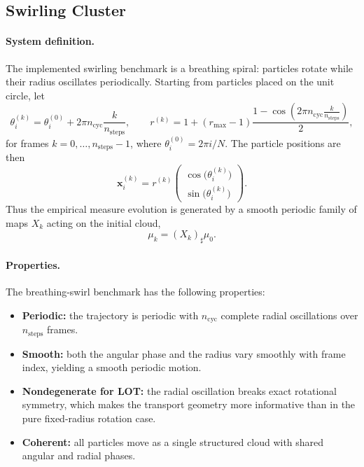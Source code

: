 \documentclass[11pt]{article}
\newcommand{\1}{\mathbf{1}}
\begin{document}
\subsection{Swirling Cluster}\label{sec:swirl}

\paragraph{System definition.}
The implemented swirling benchmark is a breathing spiral: particles rotate while their radius oscillates periodically. Starting from particles placed on the unit circle, let
\begin{equation}\label{eq:swirl-ode}
\theta_i^{(k)} = \theta_i^{(0)} + 2\pi n_{\mathrm{cyc}}\frac{k}{n_{\mathrm{steps}}}, 
\qquad
r^{(k)} = 1 + (r_{\max}-1)\frac{1-\cos\!\left(2\pi n_{\mathrm{cyc}} \frac{k}{n_{\mathrm{steps}}}\right)}{2},
\end{equation}
for frames \(k=0,\dots,n_{\mathrm{steps}}-1\), where \(\theta_i^{(0)}=2\pi i/N\). The particle positions are then
\[
\mathbf{x}_i^{(k)} = r^{(k)}
\begin{pmatrix}
\cos\!\bigl(\theta_i^{(k)}\bigr)\\[0.3ex]
\sin\!\bigl(\theta_i^{(k)}\bigr)
\end{pmatrix}.
\]
Thus the empirical measure evolution is generated by a smooth periodic family of maps \(X_k\) acting on the initial cloud,
\begin{equation}\label{eq:swirl-measure}
\mu_k = (X_k)_\sharp \mu_0.
\end{equation}

\paragraph{Properties.}
The breathing-swirl benchmark has the following properties:
\begin{itemize}
\item \textbf{Periodic:} the trajectory is periodic with \(n_{\mathrm{cyc}}\) complete radial oscillations over \(n_{\mathrm{steps}}\) frames.
\item \textbf{Smooth:} both the angular phase and the radius vary smoothly with frame index, yielding a smooth periodic motion.
\item \textbf{Nondegenerate for LOT:} the radial oscillation breaks exact rotational symmetry, which makes the transport geometry more informative than in the pure fixed-radius rotation case.
\item \textbf{Coherent:} all particles move as a single structured cloud with shared angular and radial phases.
\end{itemize}
\end{document}
